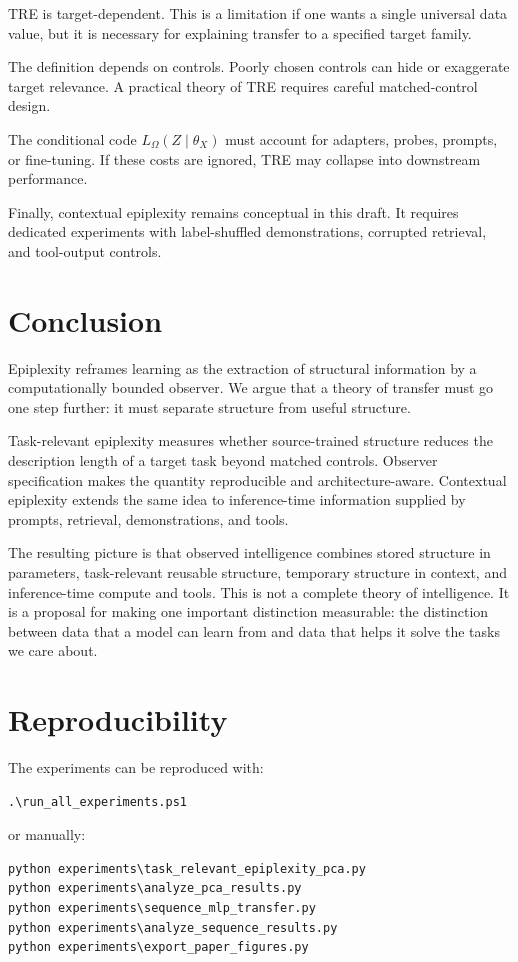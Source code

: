 \documentclass[11pt]{article}
\begin{document}
TRE is target-dependent. This is a limitation if one wants a single universal data value, but it is necessary for explaining transfer to a specified target family.

The definition depends on controls. Poorly chosen controls can hide or exaggerate target relevance. A practical theory of TRE requires careful matched-control design.

The conditional code $L_\Omega(Z \mid \theta_X)$ must account for adapters, probes, prompts, or fine-tuning. If these costs are ignored, TRE may collapse into downstream performance.

Finally, contextual epiplexity remains conceptual in this draft. It requires dedicated experiments with label-shuffled demonstrations, corrupted retrieval, and tool-output controls.

\section{Conclusion}

Epiplexity reframes learning as the extraction of structural information by a computationally bounded observer. We argue that a theory of transfer must go one step further: it must separate structure from useful structure.

Task-relevant epiplexity measures whether source-trained structure reduces the description length of a target task beyond matched controls. Observer specification makes the quantity reproducible and architecture-aware. Contextual epiplexity extends the same idea to inference-time information supplied by prompts, retrieval, demonstrations, and tools.

The resulting picture is that observed intelligence combines stored structure in parameters, task-relevant reusable structure, temporary structure in context, and inference-time compute and tools. This is not a complete theory of intelligence. It is a proposal for making one important distinction measurable: the distinction between data that a model can learn from and data that helps it solve the tasks we care about.

\appendix

\section{Reproducibility}
\label{app:repro}

The experiments can be reproduced with:
\begin{verbatim}
.\run_all_experiments.ps1
\end{verbatim}
or manually:
\begin{verbatim}
python experiments\task_relevant_epiplexity_pca.py
python experiments\analyze_pca_results.py
python experiments\sequence_mlp_transfer.py
python experiments\analyze_sequence_results.py
python experiments\export_paper_figures.py
\end{verbatim}
\end{document}
